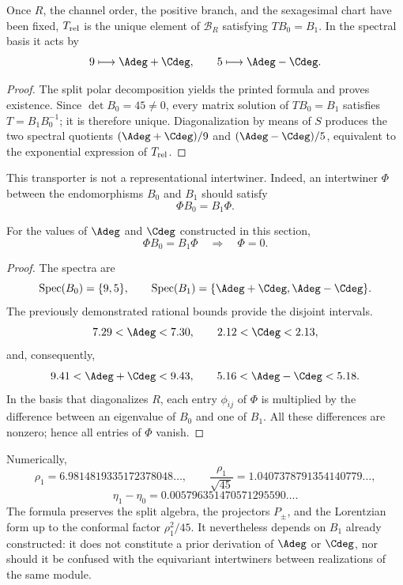 \begin{proposition}
\label{p3-20260826:prop:transportador-relativo-split}
Once \(R\), the channel order, the positive branch, and the sexagesimal
chart have been fixed, \(T_{\rm rel}\) is the unique element of
\(\mathscr B_R\) satisfying \(TB_0=B_1\). In the spectral basis it acts by
\[
 9\longmapsto\Adeg+\Cdeg,
 \qquad
 5\longmapsto\Adeg-\Cdeg.
\]
\end{proposition}

\begin{proof}
The split polar decomposition yields the printed formula and proves existence.
Since \(\det B_0=45\ne0\), every matrix solution of \(TB_0=B_1\) satisfies
\(T=B_1B_0^{-1}\); it is therefore unique. Diagonalization by means of \(S\)
produces the two spectral quotients
\((\Adeg+\Cdeg)/9\) and \((\Adeg-\Cdeg)/5\), equivalent to the exponential
expression of \(T_{\rm rel}\).
\end{proof}

This transporter is not a representational intertwiner. Indeed, an
intertwiner \(\Phi\) between the endomorphisms \(B_0\) and \(B_1\) should
satisfy
\[
 \Phi B_0=B_1\Phi.
\]

\begin{theorem}
\label{p3-20260826:thm:no-go-entrelazador-bloques-split}
For the values of \(\Adeg\) and \(\Cdeg\) constructed in this section,
\[
 \boxed{\Phi B_0=B_1\Phi\quad\Longrightarrow\quad\Phi=0.}
\]
\end{theorem}

\begin{proof}
The spectra are
\[
 \operatorname{Spec}(B_0)=\{9,5\},
 \qquad
 \operatorname{Spec}(B_1)
 =\{\Adeg+\Cdeg,\Adeg-\Cdeg\}.
\]
The previously demonstrated rational bounds provide the disjoint intervals.
\[
 7.29<\Adeg<7.30,
 \qquad
 2.12<\Cdeg<2.13,
\]
and, consequently,
\[
 9.41<\Adeg+\Cdeg<9.43,
 \qquad
 5.16<\Adeg-\Cdeg<5.18.
\]
In the basis that diagonalizes \(R\), each entry \(\phi_{ij}\) of \(\Phi\)
is multiplied by the difference between an eigenvalue of \(B_0\) and one of
\(B_1\). All these differences are nonzero; hence all entries of
\(\Phi\) vanish.
\end{proof}

Numerically,
\[
 \rho_1=6.9814819335172378048\ldots,
 \qquad
 \frac{\rho_1}{\sqrt{45}}=1.0407378791354140779\ldots,
\]
\[
 \eta_1-\eta_0
 =0.005796351470571295590\ldots.
\]
The formula preserves the split algebra, the projectors \(P_\pm\), and the
Lorentzian form up to the conformal factor \(\rho_1^2/45\). It nevertheless depends
on \(B_1\) already constructed: it does not constitute a prior derivation of
\(\Adeg\) or \(\Cdeg\), nor should it be confused with the
equivariant intertwiners between realizations of the same module.

